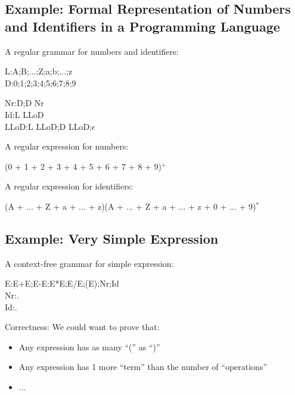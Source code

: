 \subsection{Example: Formal Representation of Numbers and Identifiers in a Programming Language}
\label{sub:Example: Formal Representation of Numbers and Identifiers in a Programming Language}

A regular grammar for numbers and identifiers:

\begin{grammar}
	L:A;B;...;Z;a;b;...;z\\
	D:0;1;2;3;4;5;6;7;8;9
\end{grammar}
\begin{grammar}
	Nr:D;D Nr\\
	Id:L LLoD\\
	LLoD:L LLoD;D LLoD;$\epsilon$
\end{grammar}
A regular expression for numbers:
\begin{grammar}
	(0 + 1 + 2 + 3 + 4 + 5 + 6 + 7 + 8 + 9)$^+$
\end{grammar}
A regular expression for identifiers:
\begin{grammar}
	[(period){.}]
	(A + ... + Z + a + ... + z)(A + ... + Z + a + ... + z + 0 + ... + 9)$^*$
\end{grammar}
\subsection{Example: Very Simple Expression}
\label{sub:Example: Very Simple Expression}
A context-free grammar for simple expression:
\begin{grammar}
	E:E+E;E-E;E*E;E/E;(E);Nr;Id\\
	Nr:.\\
	Id:.
\end{grammar}
{\color{magenta}Correctness:} We could want to prove that:
\begin{itemize}
	\item Any expression has as many ``('' as ``)''
	\item Any expression has 1 more ``term'' than the number of ``operations''
	\item ...
\end{itemize}

